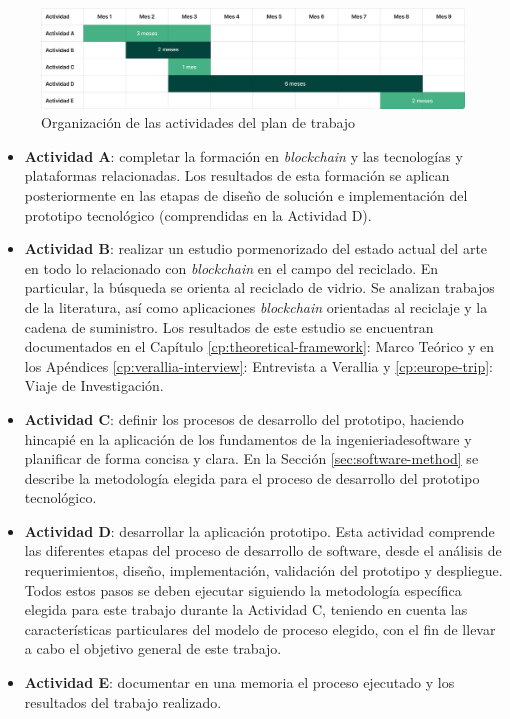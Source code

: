 \begin{figure}[!htb]
    \centering
    \includegraphics[width=\textwidth]{Figures/activities-plan.png}
    \caption{Organización de las actividades del plan de trabajo}
    \label{fig:activities-plan}
\end{figure}

\begin{itemize}
	\item \textbf{Actividad A}: completar la formación en \textit{blockchain} y las tecnologías y plataformas relacionadas. Los resultados de esta formación se aplican posteriormente en las etapas de diseño de solución e implementación del prototipo tecnológico (comprendidas en la Actividad D).
	\item \textbf{Actividad B}: realizar un estudio pormenorizado del estado actual del arte en todo lo relacionado con \textit{blockchain} en el campo del reciclado. En particular, la búsqueda se orienta al reciclado de vidrio. Se analizan trabajos de la literatura, así como aplicaciones \textit{blockchain} orientadas al reciclaje y la cadena de suministro. Los resultados de este estudio se encuentran documentados en el Capítulo \ref{cp:theoretical-framework}: Marco Teórico y en los Apéndices \ref{cp:verallia-interview}: Entrevista a Verallia y \ref{cp:europe-trip}: Viaje de Investigación.
	\item \textbf{Actividad C}: definir los procesos de desarrollo del prototipo, haciendo hincapié en la aplicación de los fundamentos de la \gls{ingenieriadesoftware} y planificar de forma concisa y clara. En la Sección \ref{sec:software-method} se describe la metodología elegida para el proceso de desarrollo del prototipo tecnológico.
	\item \textbf{Actividad D}: desarrollar la aplicación prototipo. Esta actividad comprende las diferentes etapas del proceso de desarrollo de \gls{software}, desde el análisis de requerimientos, diseño, implementación, validación del prototipo y despliegue. Todos estos pasos se deben ejecutar siguiendo la metodología específica elegida para este trabajo durante la Actividad C, teniendo en cuenta las características particulares del modelo de proceso elegido, con el fin de llevar a cabo el objetivo general de este trabajo.
	\item \textbf{Actividad E}: documentar en una memoria el proceso ejecutado y los resultados del trabajo realizado.
\end{itemize}

